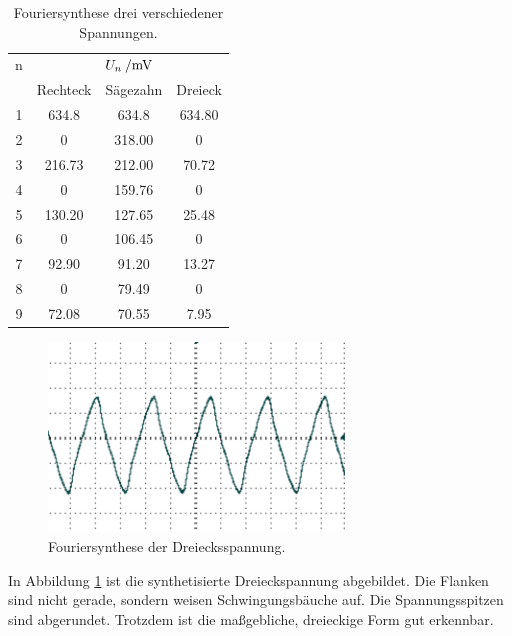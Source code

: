 \begin{table}
	\centering
	\begin{tabular}{cccc}	
	\toprule
\multicolumn{1}{c}{n} & \multicolumn{3}{c}{$U_n\:/\si{\milli{\volt}}$}\\
	{} & {Rechteck} & {Sägezahn} & {Dreieck}\\
	\midrule
 1 & 634.8  & 634.8  & 634.80\\
 2 &   0    & 318.00 &   0\\
 3 & 216.73 & 212.00 &  70.72\\
 4 &   0    & 159.76 &   0\\
 5 & 130.20 & 127.65 &  25.48\\
 6 &   0    & 106.45 &   0\\
 7 &  92.90 &  91.20 &  13.27\\
 8 &   0    &  79.49 &   0\\
 9 &  72.08 &  70.55 &  7.95\\
	\bottomrule
	\end{tabular}
	\caption{Fouriersynthese drei verschiedener Spannungen.}
	\label{tab:FS}
\end{table}






\begin{figure}
	\centering
		\includegraphics[width=0.7\textwidth]{Bilder/1-9_DE.pdf}		
\caption{Fouriersynthese der Dreiecksspannung.}
	\label{fig:1-9_DE}
\end{figure}

In Abbildung \ref{fig:1-9_DE} ist die synthetisierte Dreieckspannung abgebildet. Die Flanken sind nicht gerade, sondern weisen Schwingungsbäuche auf. Die Spannungsspitzen sind abgerundet. Trotzdem ist die maßgebliche, dreieckige Form gut erkennbar.

